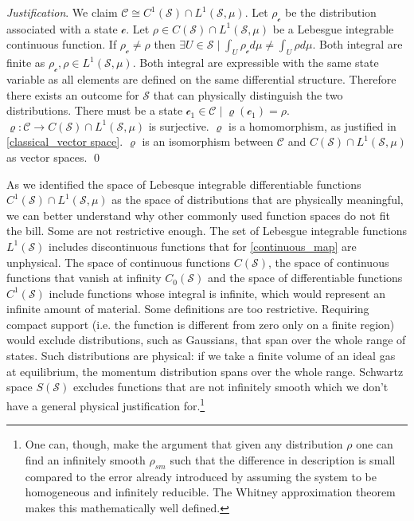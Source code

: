 \documentclass[aps,pra,10pt,twocolumn,floatfix,nofootinbib]{revtex4-1}
\numberwithin{equation}{section}
\theoremstyle{definition}
\newenvironment{justification}{\emph{Justification}.}{\qed}
\begin{document}
\begin{justification}
	We claim $\mathcal{C} \cong C^1(\mathcal{S}) \cap L^1(\mathcal{S}, \mu)$. Let $\rho_\mathcal{c}$ be the distribution associated with a state $\mathcal{c}$. Let $\rho \in C(\mathcal{S}) \cap  L^1(\mathcal{S}, \mu)$ be a Lebesgue integrable continuous function. If $\rho_\mathcal{c} \neq \rho$ then $\exists U \in \mathcal{S} \; | \; \int_{U} \rho_\mathcal{c} d \mu \neq \int_{U} \rho d \mu$. Both integral are finite as $\rho_\mathcal{c}, \rho \in L^1(\mathcal{S}, \mu)$. Both integral are expressible with the same state variable as all elements are defined on the same differential structure. Therefore there exists an outcome for $\mathcal{S}$ that can physically distinguish the two distributions. There must be a state $\mathcal{c}_1 \in \mathcal{C} \; | \; \varrho(\mathcal{c}_1)=\rho$. $\varrho : \mathcal{C} \rightarrow C(\mathcal{S}) \cap  L^1(\mathcal{S}, \mu)$ is surjective. $\varrho$ is a homomorphism, as justified in \ref{classical_vector space}. $\varrho$ is an isomorphism between $\mathcal{C}$ and $C(\mathcal{S}) \cap  L^1(\mathcal{S}, \mu)$ as vector spaces.
\end{justification}

As we identified the space of Lebesque integrable differentiable functions $C^1(\mathcal{S}) \cap  L^1(\mathcal{S}, \mu)$ as the space of distributions that are physically meaningful, we can better understand why other commonly used function spaces do not fit the bill. Some are not restrictive enough. The set of Lebesgue integrable functions $L^1(\mathcal{S})$ includes discontinuous functions that for \ref{continuous_map} are unphysical. The space of continuous functions $C(\mathcal{S})$, the space of continuous functions that vanish at infinity $C_0(\mathcal{S})$ and the space of differentiable functions $C^1(\mathcal{S})$ include functions whose integral is infinite, which would represent an infinite amount of material. Some definitions are too restrictive. Requiring compact support (i.e. the function is different from zero only on a finite region) would exclude distributions, such as Gaussians, that span over the whole range of states. Such distributions are physical: if we take a finite volume of an ideal gas at equilibrium, the momentum distribution spans over the whole range. Schwartz space $S(\mathcal{S})$ excludes functions that are not infinitely smooth which we don't have a general physical justification for.\footnote{One can, though, make the argument that given any distribution $\rho$ one can find an infinitely smooth $\rho_{sm}$ such that the difference in description is small compared to the error already introduced by assuming the system to be homogeneous and infinitely reducible. The Whitney approximation theorem makes this mathematically well defined.}
\end{document}

